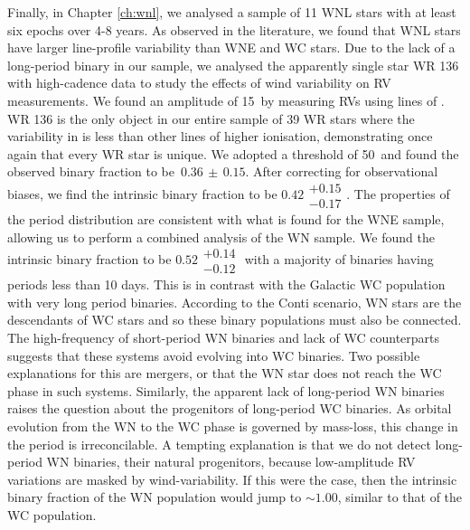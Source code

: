 Finally, in Chapter \ref{ch:wnl}, we analysed a sample of 11 WNL stars with at least six epochs over 4-8 years. As observed in the literature, we found that WNL stars have larger line-profile variability than WNE and WC stars. Due to the lack of a long-period binary in our sample, we analysed the apparently single star WR 136 with high-cadence data to study the effects of wind variability on RV measurements. We found an amplitude of 15\,\kms{} by measuring RVs using lines of \heii{}. WR 136 is the only object in our entire sample of 39 WR stars where the variability in \heii{} is less than other lines of higher ionisation, demonstrating once again that every WR star is unique. We adopted a threshold of 50\,\kms{} and found the observed binary fraction to be $\,0.36\,\pm\,0.15$. After correcting for observational biases, we find the intrinsic binary fraction to be $0.42\substack{+0.15 \\ -0.17}$. The properties of the period distribution are consistent with what is found for the WNE sample, allowing us to perform a combined analysis of the WN sample. We found the intrinsic binary fraction to be $0.52\substack{+0.14 \\ -0.12}$ with a majority of binaries having periods less than 10 days. This is in contrast with the Galactic WC population with very long period binaries. According to the Conti scenario, WN stars are the descendants of WC stars and so these binary populations must also be connected. The high-frequency of short-period WN binaries and lack of WC counterparts suggests that these systems avoid evolving into WC binaries. Two possible explanations for this are mergers, or that the WN star does not reach the WC phase in such systems. Similarly, the apparent lack of long-period WN binaries raises the question about the progenitors of long-period WC binaries. As orbital evolution from the WN to the WC phase is governed by mass-loss, this change in the period is irreconcilable. A tempting explanation is that we do not detect long-period WN binaries, their natural progenitors, because low-amplitude RV variations are masked by wind-variability. If this were the case, then the intrinsic binary fraction of the WN population would jump to ${\sim}1.00$, similar to that of the WC population.





